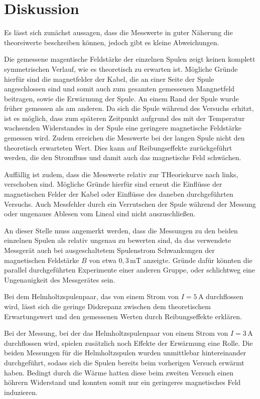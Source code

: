 \section{Diskussion}
\label{sec:Diskussion}
Es lässt sich zunächst aussagen, dass die Messwerte in guter Näherung die theoreiwerte
beschreiben können, jedoch gibt es kleine Abweichungen.

Die gemessene magentische Feldstärke der einzelnen Spulen zeigt keinen komplett
symmetrischen Verlauf, wie es theoretisch zu erwarten ist. Mögliche Gründe hierfür sind
die magnetfelder der Kabel, die an einer Seite der Spule angeschlossen sind und somit
auch zum gesamten gemessenen Mangnetfeld beitragen, sowie die Erwärmung der Spule.
An einem Rand der Spule wurde früher gemessen als am anderen. Da sich die Spule
während des Versuchs erhitzt, ist es möglich, dass zum späteren Zeitpunkt aufgrund des
mit der Temperatur wachsenden Widerstandes in der Spule eine geringere magnetische
Feldstärke gemessen wird. Zudem erreichen die Messwerte bei der langen Spule nicht
den theoretisch erwarteten Wert. Dies kann auf Reibungseffekte zurückgeführt werden,
die den Stromfluss und damit auch das magnetische Feld schwächen.

Auffällig ist zudem, dass die Messwerte relativ zur THeoriekurve nach links, verschoben sind.
Mögliche Gründe hierfür sind erneut die Einflüsse der magnetischen Felder der Kabel oder
Einflüsse des daneben durchgeführten Versuchs. Auch Messfehler durch ein Verrutschen
der Spule während der Messung oder ungenaues Ablesen vom Lineal sind nicht auszuschließen.

An dieser Stelle muss angemerkt werden, dass die Messungen zu den beiden einzelnen Spulen
als relativ ungenau zu bewerten sind, da das verwendete Messgerät auch bei ausgeschaltetem
Spulenstrom Schwankungen der magnetischen Feldstärke $B$ von etwa $0,3$\,mT anzeigte.
Gründe dafür könnten die parallel durchgeführten Experimente einer anderen Gruppe,
oder schlichtweg eine Ungenauigkeit des Messgerätes sein.

Bei dem Helmholtzspulenpaar, das von einem
Strom von $I=5$\,A durchflossen wird, lässt sich die geringe Diskrepanz zwischen dem
theoretischem Erwartungswert und den gemessenen Werten durch Reibungseffekte erklären.

Bei der Messung, bei der das Helmholtzspulenpaar von einem Strom von $I=3$\,A durchflossen
wird, spielen zusätzlich noch Effekte der Erwärmung eine Rolle. Die beiden Messungen
für die Helmholtzspulen wurden unmittlebar hintereinander durchgeführt, sodass sich die
Spulen bereits beim vorherigen Versuch erwärmt haben. Bedingt durch die Wärme
hatten diese beim zweiten Versuch einen höhrern Widerstand und konnten somit nur ein
geringeres magnetisches Feld induzieren.


